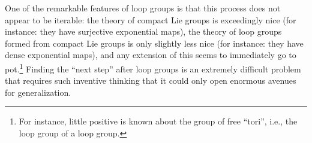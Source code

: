 One of the remarkable features of loop groups is that this process does not appear to be iterable: the theory of compact Lie groups is exceedingly nice (for instance: they have surjective exponential maps), the theory of loop groups formed from compact Lie groups is only slightly less nice (for instance: they have dense exponential maps), and any extension of this seems to immediately go to pot.\footnote{For instance, little positive is known about the group of free ``tori'', i.e., the loop group of a loop group.}  Finding the ``next step'' after loop groups is an extremely difficult problem that requires such inventive thinking that it could only open enormous avenues for generalization.









